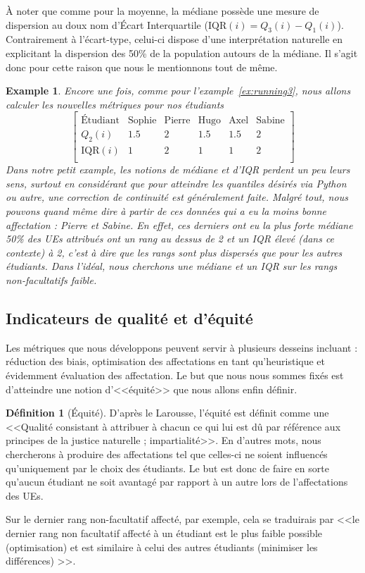\documentclass{rapport}
\theoremstyle{definition}
\newtheorem{definition}{Définition}
\theoremstyle{remark}
\theoremstyle{plain}
\newtheorem{example}{Example}
\theoremstyle{definition}
\theoremstyle{remark}
\begin{document}
À noter que comme pour la moyenne, la médiane possède une mesure de dispersion au doux nom d'Écart Interquartile ($\text{IQR}(i) = Q_3(i)-Q_1(i)$). 
Contrairement à l'écart-type, celui-ci dispose d'une interprétation naturelle en explicitant la dispersion des 50\% de la population autours de la médiane. 
Il s'agit donc pour cette raison que nous le mentionnons tout de même.

\begin{example}\label{ex:running4}
    Encore une fois, comme pour l'example~\ref{ex:running3}, nous allons calculer les nouvelles métriques pour nos étudiants
    $$
    \begin{bmatrix}
        \text{Étudiant} & \text{Sophie} & \text{Pierre} & \text{Hugo} & \text{Axel} & \text{Sabine}\\
        Q_2(i)          & 1.5 & 2 & 1.5 & 1.5 & 2\\
        \text{IQR}(i)   & 1   & 2 & 1   & 1   & 2\\
    \end{bmatrix}
    $$
    Dans notre petit example, les notions de médiane et d'IQR perdent un peu leurs sens, surtout en considérant que pour atteindre les quantiles désirés via Python ou autre, une correction de continuité est généralement faite. 
    Malgré tout, nous pouvons quand même dire à partir de ces données qui a eu la moins bonne affectation : Pierre et Sabine. 
    En effet, ces derniers ont eu la plus forte médiane 50\% des UEs attribués ont un rang au dessus de 2 et un IQR élevé (dans ce contexte) à 2, c'est à dire que les rangs sont  plus dispersés que pour les autres étudiants.
    Dans l'idéal, nous cherchons une médiane et un IQR sur les rangs non-facultatifs faible.
\end{example}

\subsection{Indicateurs de qualité et d'équité}
Les métriques que nous développons peuvent servir à plusieurs desseins incluant : réduction des biais, optimisation des affectations en tant qu'heuristique et évidemment évaluation des affectation.
Le but que nous nous sommes fixés est d'atteindre une notion d'<<équité>> que nous allons enfin définir.

\begin{definition}[Équité]
    D'après le Larousse, l'équité est définit comme une <<Qualité consistant à attribuer à chacun ce qui lui est dû par référence aux principes de la justice naturelle ; impartialité>>. 
    En d'autres mots, nous chercherons à produire des affectations tel que celles-ci ne soient influencés qu'uniquement par le choix des étudiants. Le but est donc de faire en sorte qu'aucun étudiant ne soit avantagé par rapport à un autre lors de l'affectations des UEs.

    Sur le dernier rang non-facultatif affecté, par exemple, cela se traduirais par <<le dernier rang non facultatif affecté à un étudiant est le plus faible possible (optimisation) et est similaire à celui des autres étudiants (minimiser les différences) >>.
\end{definition}
\end{document}
